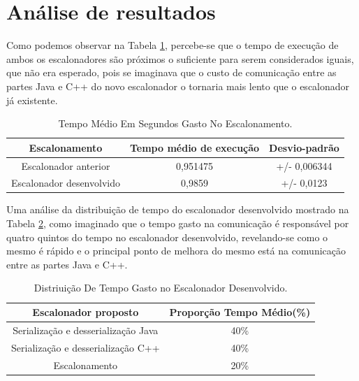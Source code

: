 \section{Análise de resultados}

Como podemos observar na Tabela \ref{TabelaTempoEscalonador}, percebe-se que o tempo de execução de ambos os escalonadores são próximos o suficiente para serem considerados iguais, que não era esperado, pois se imaginava que o custo de comunicação entre as partes Java e C++ do novo escalonador o tornaria mais lento que o escalonador já existente.


\begin {table}[H]
\begin{center}
	\begin{tabular}{ |c|c|c| } 
		\hline
		Escalonamento & Tempo médio de execução & Desvio-padrão \\ 
		\hline
		Escalonador anterior & 0,951475 & +/- 0,006344 \\ 
		\hline
		Escalonador desenvolvido & 0,9859 & +/- 0,0123 \\ 
		\hline
	\end{tabular}
\caption {Tempo Médio Em Segundos Gasto No Escalonamento.} \label{TabelaTempoEscalonador} 
\end{center}
\end {table}

Uma análise da distribuição de tempo do escalonador desenvolvido mostrado na Tabela \ref{TabelaProporcaoEscalonador}, como imaginado que o tempo gasto na comunicação é responsável por quatro quintos do tempo no escalonador desenvolvido, revelando-se como o mesmo é rápido e o principal ponto de melhora do mesmo está na comunicação entre as partes Java e C++.

\begin {table}[H]
\begin{center}
	\begin{tabular}{ |c|c| } 
		\hline
		Escalonador proposto & Proporção Tempo Médio(\%) \\ 
		\hline
		Serialização e desserialização Java & 40\% \\ 
		\hline
		Serialização e desserialização C++ & 40\% \\ 
		\hline
		Escalonamento & 20\% \\ 
		\hline
	\end{tabular}
\caption {Distriuição De Tempo Gasto no Escalonador Desenvolvido.} \label{TabelaProporcaoEscalonador} 
\end{center}
\end {table}

